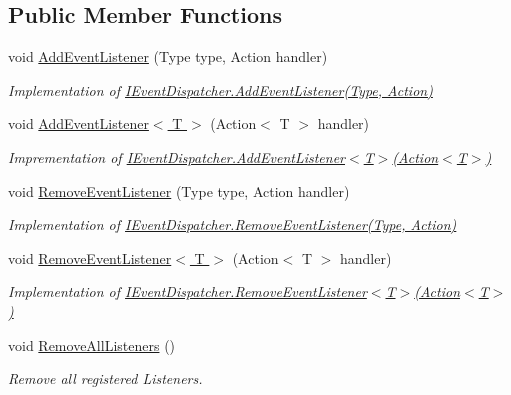 \subsection*{Public Member Functions}
\begin{DoxyCompactItemize}
\item 
void \hyperlink{class_events_1_1_event_dispatcher_af8047b3f53861d56c27aa02e358486a2}{Add\+Event\+Listener} (Type type, Action handler)
\begin{DoxyCompactList}\small\item\em Implementation of \hyperlink{interface_events_1_1_i_event_dispatcher_ac22d58973ca79fdaea1471704dba0e01}{I\+Event\+Dispatcher.\+Add\+Event\+Listener(\+Type, Action)} \end{DoxyCompactList}\item 
void \hyperlink{class_events_1_1_event_dispatcher_ab90178e5a5bbfd90601347ab8489cf01}{Add\+Event\+Listener$<$ T $>$} (Action$<$ T $>$ handler)
\begin{DoxyCompactList}\small\item\em Imprementation of \hyperlink{interface_events_1_1_i_event_dispatcher_a4c10e52a26a0c354bcaae21e0a240f93}{I\+Event\+Dispatcher.\+Add\+Event\+Listener$<$\+T$>$(\+Action$<$\+T$>$)} \end{DoxyCompactList}\item 
void \hyperlink{class_events_1_1_event_dispatcher_a9644ebc4fb5655cda345b586e5749ea0}{Remove\+Event\+Listener} (Type type, Action handler)
\begin{DoxyCompactList}\small\item\em Implementation of \hyperlink{interface_events_1_1_i_event_dispatcher_ae3209681ebdbcf8289905ff6ccdbd188}{I\+Event\+Dispatcher.\+Remove\+Event\+Listener(\+Type, Action)} \end{DoxyCompactList}\item 
void \hyperlink{class_events_1_1_event_dispatcher_a88f24cbfab1022517830b3fc42155c15}{Remove\+Event\+Listener$<$ T $>$} (Action$<$ T $>$ handler)
\begin{DoxyCompactList}\small\item\em Implementation of \hyperlink{interface_events_1_1_i_event_dispatcher_a86e3438c779746108c3f01dff0c43d23}{I\+Event\+Dispatcher.\+Remove\+Event\+Listener$<$\+T$>$(\+Action$<$\+T$>$)} \end{DoxyCompactList}\item 
void \hyperlink{class_events_1_1_event_dispatcher_add2667245c85f8d781eed8d908450518}{Remove\+All\+Listeners} ()
\begin{DoxyCompactList}\small\item\em Remove all registered Listeners. \end{DoxyCompactList}\item 

\end{DoxyCompactItemize}
